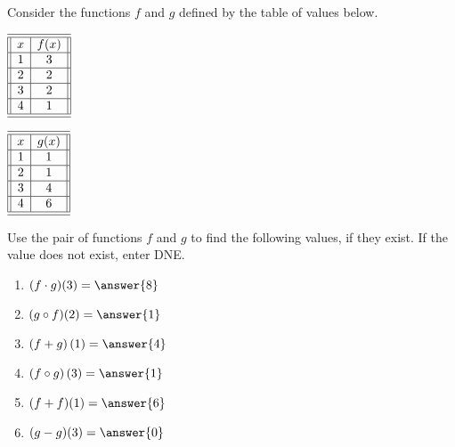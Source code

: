 \documentclass{ximera}
\author{Kenneth Berglund}
\begin{document}
\licenseSZ
\begin{exercise}
Consider the functions $f$ and $g$ defined by the table of values below. \\
		\begin{minipage}{.5\textwidth}
		  	\begin{center}
				$\begin{array}{||c|c||}
					\hline 
					\hline
					x & f(x)\\
					\hline
					1&3\\
					\hline
					2&2\\
					\hline
					3&2\\
					\hline
					4& 1\\
					\hline 
					\hline
				\end{array}$
			\end{center}
		\end{minipage}%
		\begin{minipage}{.5\textwidth}
		  	\begin{center}
				$\begin{array}{||c|c||}
					\hline 
					\hline
					x & g(x)\\
					\hline
					1&1\\
					\hline
					2&1\\
					\hline
					3&4\\
					\hline
					4& 6\\
					\hline 
					\hline
				\end{array}$
			\end{center}
		\end{minipage}
Use the pair of functions $f$ and $g$ to find the following values, if they exist. If the value does not exist, enter DNE.
\begin{enumerate}
\item $(f \cdot g)(3) = \answer{8}$
\item $(g \circ f)(2) = \answer{1}$
\item $(f + g)\left(1\right) = \answer{4}$
\item $(f\circ g)\left(3\right) = \answer{1}$
\item $(f + f)(1) = \answer{6}$
\item $(g - g)(3) = \answer{0}$
\end{enumerate}

\end{exercise}
\end{document}
